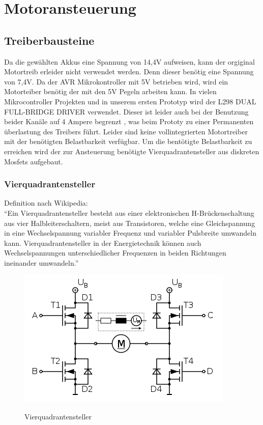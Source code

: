 \chapter{Motoransteuerung}

\section{Treiberbausteine}
Da die gewählten Akkus eine Spannung von 14,4V aufweisen, kann der orgiginal Motortreib erleider nicht verwendet werden.
Denn dieser benötig eine Spannung von 7,4V. Da der AVR Mikrokontroller mit 5V betrieben wird, wird ein Motorteiber benötig der
mit den 5V Pegeln arbeiten kann. In vielen Mikrocontroller Projekten und in unserem ersten Prototyp wird der L298 DUAL FULL-BRIDGE DRIVER
verwendet. Dieser ist leider auch bei der Benutzung beider Kanäle auf 4 Ampere begrenzt \cite{L298}, was beim Prototy zu einer Permanenten
überlastung des Treibers führt. Leider sind keine vollintegrierten Motortreiber mit der benötigten Belastbarkeit verfügbar.
Um die bentötigte Belastbarkeit zu erreichen wird der zur Ansteuerung benötigte Vierquadrantensteller aus diskreten Mosfets aufgebaut.

\subsection{Vierquadrantensteller}
Definition nach Wikipedia:\\
``Ein Vierquadrantensteller besteht aus einer elektronischen H-Brückenschaltung aus vier Halbleiterschaltern, meist aus Transistoren, 
welche eine Gleichspannung in eine Wechselspannung variabler Frequenz und variabler Pulsbreite umwandeln kann. Vierquadrantensteller 
in der Energietechnik können auch Wechselspannungen unterschiedlicher Frequenzen in beiden Richtungen ineinander umwandeln.''


\begin{figure}[H]
\centering
\includegraphics[width=.8\textwidth]{Vierquadrantensteller.png}\\
\caption{Vierquadrantensteller}%
\label{fig:Vierquadrantensteller}
\end{figure}


